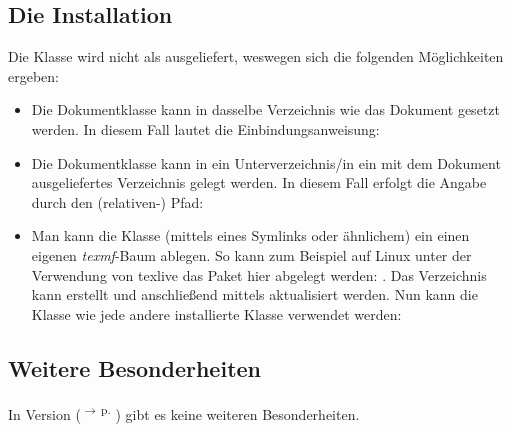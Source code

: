 \documentclass{sopra-base}
\def\cmdref#1{\hyperref[mrk:#1]{\lstkwfive{\textbackslash#1}}\textsuperscript{\(\rightarrow\,\)p. \pageref{mrk:#1}}}
\begin{document}
\subsection{Die Installation}
    Die Klasse wird nicht als  ausgeliefert, weswegen sich die 
    folgenden Möglichkeiten ergeben:
    \begin{itemize}
        \item Die Dokumentklasse kann in dasselbe Verzeichnis wie das Dokument
                gesetzt werden. In diesem Fall lautet die Einbindungsanweisung:
        \item Die Dokumentklasse kann in ein Unterverzeichnis/in ein mit
                dem Dokument ausgeliefertes Verzeichnis gelegt werden. In
                diesem Fall erfolgt die Angabe durch den (relativen-) Pfad:
        \item Man kann die Klasse (mittels eines Symlinks oder ähnlichem)
              ein einen eigenen \emph{texmf}-Baum ablegen.
              So kann zum Beispiel auf Linux unter der Verwendung von texlive
              das Paket hier abgelegt werden: .
              Das Verzeichnis kann erstellt und anschließend mittels
               aktualisiert werden. Nun kann
              die Klasse wie jede andere installierte Klasse verwendet werden:
    \end{itemize}
    \subsection{Weitere Besonderheiten}
    In Version \thesobversion{} (\cmdref{thesobversion}) gibt es keine weiteren
    Besonderheiten.
\end{document}
